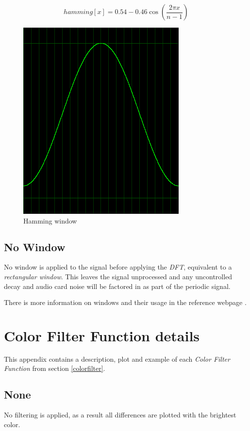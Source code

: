 \documentclass[10pt,a4paper]{report}
\begin{document}
\begin{appendices}
\begin{equation}
hamming[x] = 0.54 - 0.46\cos(\frac{2\pi x}{n-1})
\end{equation}

\begin{figure}[H]
	\centering
	\includegraphics[width=0.4\linewidth]{images/windows/window-hamming.png}
	\caption[Hamming window]{Hamming window}
	\label{fig:window-hamming}
\end{figure}

\section{No Window}

No window is applied to the signal before applying the \textit{DFT}, equivalent to a \textit{rectangular window}. This leaves the signal unprocessed and any uncontrolled decay and audio card noise will be factored in as part of the periodic signal.

There is more information on windows and their usage in the reference webpage \cite{windowtypes}.

\chapter{Color Filter Function details}
\label{filterfunctions}

This appendix contains a description, plot and example of each \textit{Color Filter Function} from section \ref{colorfilter}.

\newpage
\section{None} 

No filtering is applied, as a result all differences are plotted with the brightest color. 


\end{appendices}
\end{document}

